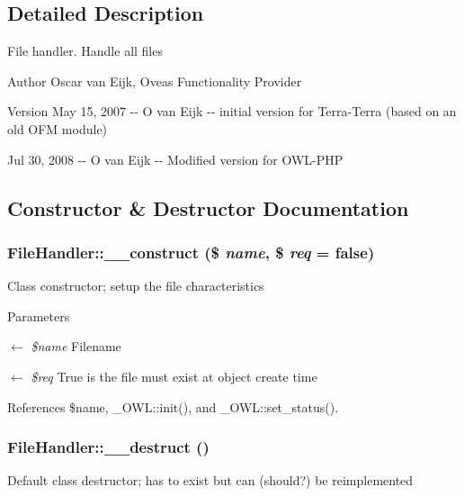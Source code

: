 \subsection{Detailed Description}
File handler. Handle all files \begin{DoxyAuthor}{Author}
Oscar van Eijk, Oveas Functionality Provider 
\end{DoxyAuthor}
\begin{DoxyVersion}{Version}
May 15, 2007 -\/-\/ O van Eijk -\/-\/ initial version for Terra-\/Terra (based on an old OFM module) 

Jul 30, 2008 -\/-\/ O van Eijk -\/-\/ Modified version for OWL-\/PHP 
\end{DoxyVersion}


\subsection{Constructor \& Destructor Documentation}
\subsubsection[{\_\-\_\-construct}]{\setlength{\rightskip}{0pt plus 5cm}FileHandler::\_\-\_\-construct (\$ {\em name}, \/  \$ {\em req} = {\ttfamily false})}\label{classFileHandler_a8d75c8ea0c532acdeae0a0a4efa3704a}
Class constructor; setup the file characteristics


\begin{DoxyParams}{Parameters}
\item[\mbox{$\leftarrow$} {\em \$name}]Filename \item[\mbox{$\leftarrow$} {\em \$req}]True is the file must exist at object create time \end{DoxyParams}


References \$name, \_\-OWL::init(), and \_\-OWL::set\_\-status().

\subsubsection[{\_\-\_\-destruct}]{\setlength{\rightskip}{0pt plus 5cm}FileHandler::\_\-\_\-destruct ()}\label{classFileHandler_a734859e8962992da99dd8f853da5ae43}
Default class destructor; has to exist but can (should?) be reimplemented 

